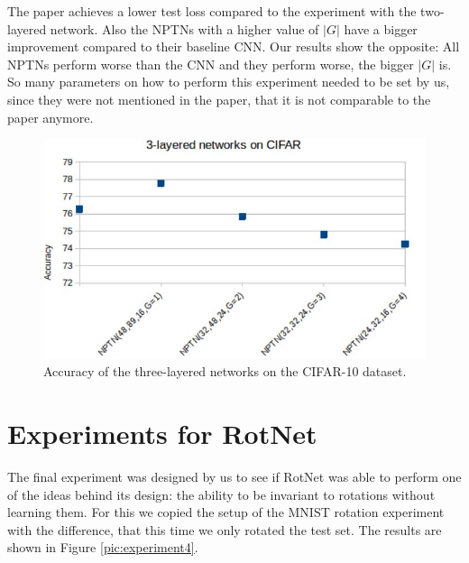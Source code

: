 \documentclass{llncs}
\begin{document}
The paper achieves a lower test loss compared to the experiment with the two-layered network. Also the NPTNs with a higher value of $|G|$ have a bigger improvement compared to their baseline CNN. Our results show the opposite: All NPTNs perform worse than the CNN and they perform worse, the bigger $|G|$ is.
So many parameters on how to perform this experiment needed to be set by us, since they were not mentioned in the paper, that it is not comparable to the paper anymore.

\begin{figure}
	\begin{center}
	\includegraphics[scale=0.35]{result_images/experiment3.jpg}
	\caption{Accuracy of the three-layered networks on  the CIFAR-10 dataset.}
	\label{pic:experiment3}
	\end{center}
\end{figure}

\section{Experiments for RotNet}
The final experiment was designed by us to see if RotNet was able to perform one of the ideas behind its design: the ability to be invariant to rotations without learning them.
For this we copied the setup of the MNIST rotation experiment with the difference, that this time we only rotated the test set. The results are shown in Figure \ref{pic:experiment4}. 
\end{document}
